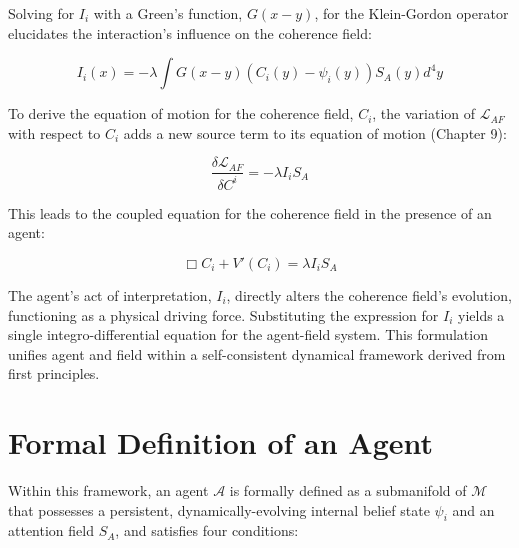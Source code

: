 Solving for \(I_i\) with a Green's function, \(G(x-y)\), for the Klein-Gordon operator elucidates the interaction's influence on the coherence field:

\begin{equation}
I_i(x) = -\lambda \int G(x-y) \left( C_i(y) - \psi_i(y) \right) S_A(y) d^4y
\end{equation}

To derive the equation of motion for the coherence field, \(C_i\), the variation of \(\mathcal{L}_{AF}\) with respect to \(C_i\) adds a new source term to its equation of motion (Chapter 9):

\begin{equation}
\frac{\delta \mathcal{L}_{AF}}{\delta C^i} = -\lambda I_i S_A
\end{equation}

This leads to the coupled equation for the coherence field in the presence of an agent:

\begin{equation}
\Box C_i + V'(C_i) = \lambda I_i S_A
\end{equation}

The agent's act of interpretation, \(I_i\), directly alters the coherence field's evolution, functioning as a physical driving force. Substituting the expression for \(I_i\) yields a single integro-differential equation for the agent-field system. This formulation unifies agent and field within a self-consistent dynamical framework derived from first principles.

\section{Formal Definition of an Agent}

Within this framework, an agent \(\mathcal{A}\) is formally defined as a submanifold of \(\mathcal{M}\) that possesses a persistent, dynamically-evolving internal belief state \(\psi_i\) and an attention field \(S_A\), and satisfies four conditions:


